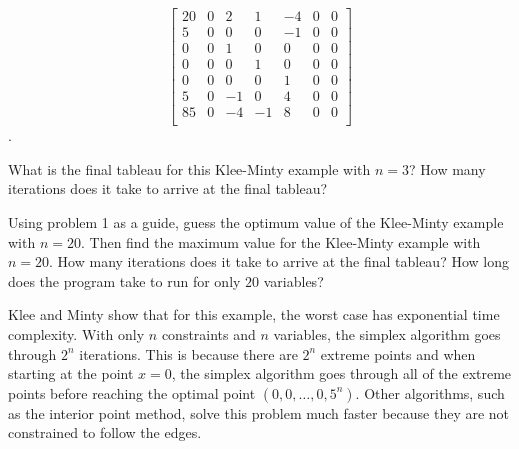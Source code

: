 $$
\begin{bmatrix}
20 & 0 & 2 & 1 & -4 & 0 & 0\\
5 & 0 & 0 & 0 & -1 & 0 & 0\\
0 & 0 & 1 & 0 & 0 & 0 & 0\\
0 & 0 & 0 & 1 & 0 & 0 & 0\\
0 & 0 & 0 & 0 & 1 & 0 & 0\\
5 & 0 & -1 & 0 & 4 & 0 & 0\\
85 & 0 & -4 & -1 & 8 & 0 & 0\\
\end{bmatrix}
$$. 

\begin{problem}
What is the final tableau for this Klee-Minty example with $n=3$?
How many iterations does it take to arrive at the final tableau?
\end{problem}

\begin{problem}
Using problem 1 as a guide, guess the optimum value of the Klee-Minty example with $n=20$.
Then find the maximum value for the Klee-Minty example with $n=20$. 
How many iterations does it take to arrive at the final tableau?
How long does the program take to run for only $20$ variables?
\end{problem}

Klee and Minty show that for this example, the worst case has exponential time complexity.
With only $n$ constraints and $n$ variables, the simplex algorithm goes through $2^n$ iterations.
This is because there are $2^n$ extreme points and when starting at the point $x=0$, the simplex algorithm goes through all of the extreme points before reaching the optimal point $(0,0,\dots, 0, 5^n)$.
Other algorithms, such as the interior point method, solve this problem much faster because they are not constrained to follow the edges. 